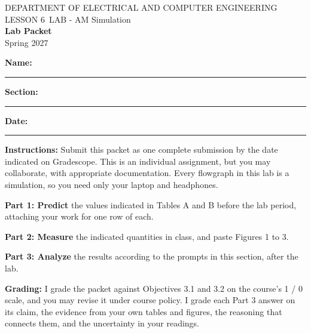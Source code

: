 \documentclass{exam}
\def\labLesson{6}
\def\thisterm{\thisTermIn}
\def\thisterm{Spring 2027}
\begin{document}
\pagestyle{headandfoot}
\begin{Form}

\begin{center}
DEPARTMENT OF ELECTRICAL AND COMPUTER ENGINEERING \\
LESSON \labLesson\ LAB - AM Simulation \\
\textbf{Lab Packet} \\
\thisterm \\[4mm]
\end{center}

\vspace{-4pt}
\textbf{Name:} \rule[-2pt]{2.6in}{0.4pt} \hfill
\textbf{Section:} \rule[-2pt]{0.9in}{0.4pt} \hfill
\textbf{Date:} \rule[-2pt]{1.1in}{0.4pt}

\vspace{4pt}


\textbf{Instructions:} Submit this packet as one complete submission by the date indicated on
Gradescope. This is an individual assignment, but you may collaborate, with appropriate
documentation. Every flowgraph in this lab is a simulation, so you need only your laptop and
headphones.

\textbf{Part 1: Predict} the values indicated in Tables A and B before the lab period,
attaching your work for one row of each.

\textbf{Part 2: Measure} the indicated quantities in class, and paste Figures 1 to 3.

\textbf{Part 3: Analyze} the results according to the prompts in this section, after the lab.

\textbf{Grading:} I grade the packet against Objectives 3.1 and 3.2 on the course's 1 / 0
scale, and you may revise it under course policy. I grade each Part 3 answer on its claim,
the evidence from your own tables and figures, the reasoning that connects them, and the
uncertainty in your readings.

\begin{procbox}
\end{procbox}


\end{Form}
\end{document}
